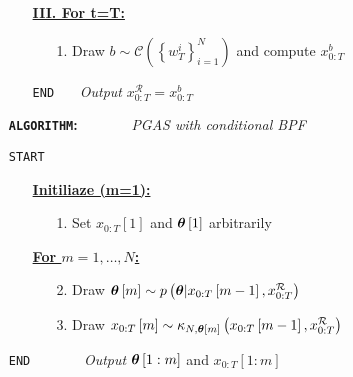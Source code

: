 \begin{itemize}
\begin{itemize}
\begin{itemize}
\end{itemize}
\end{itemize}
\begin{itemize}
\item[] \underline{\textbf{III. For t=T:}}
\begin{itemize}
\item[1.] Draw $b\sim \mathcal{C}\left(\left\lbrace w_T^i\right\rbrace_{i=1}^N\right)$ and compute $x_{0:T}^b$
\end{itemize}
\item[\texttt{END}] ~~~\textit{Output} $x_{0:T}^{\mathcal{R}}=x_{0:T}^b$
\end{itemize}
\item[]
\end{itemize}
\begin{itemize}
\item[\textbf{\texttt{ALGORITHM}:}]~~~~~~~\textit{PGAS with conditional BPF}\label{ag:2}
\item[\texttt{START}]
\begin{itemize}
\item[] \underline{\textbf{Initiliaze (m=1):}}
\begin{itemize}
\item[1.] Set $x_{0:T}\left[ 1\right]$ and $\boldsymbol{\theta}\left[ 1\right]$ arbitrarily
\end{itemize}
\item[] \underline{\textbf{For $m=1,\ldots,N$:}}
\begin{itemize}
\item[2.] Draw $\boldsymbol{\theta}\left[ m \right] \sim p\left(\boldsymbol{\theta}|x_{0:T}\left[ m-1 \right] , x_{0:T}^{\mathcal{R}}\right)$
\item[3.] Draw $x_{0:T}\left[ m \right] \sim \kappa_{N,\boldsymbol{\theta}\left[ m \right]} \left(x_{0:T}\left[ m-1 \right] , x_{0:T}^{\mathcal{R}}\right)$
\end{itemize}
\end{itemize}
\item[\texttt{END}]  ~~~~~~~\textit{Output}  $\boldsymbol{\theta}\left[ 1:m \right] $ and $x_{0:T}\left[1:m \right]$
\end{itemize}